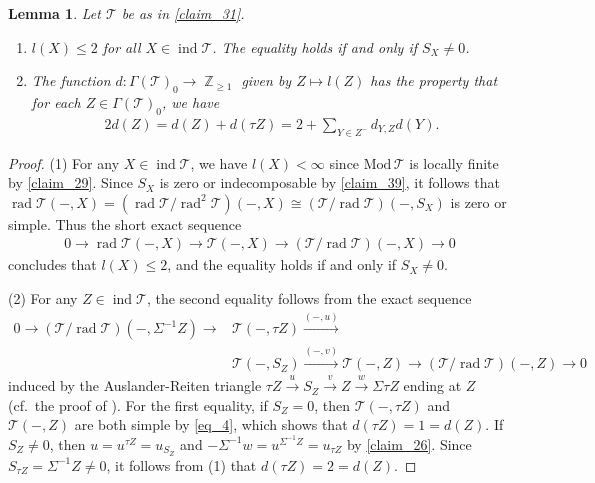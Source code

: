 \documentclass[12pt]{amsart}
\numberwithin{equation}{subsection}
\theoremstyle{plain}
\newtheorem{lemma}[theorem]{Lemma}
\theoremstyle{definition}
\newcommand{\rad}{\operatorname{rad}}
\newcommand{\Mod}{\mathrm{Mod}\,}
\newcommand{\ind}{\operatorname{ind}}
\newcommand{\Z}{\operatorname{\mathbb{Z}}\nolimits}
\newcommand{\G}{\Gamma}
\newcommand{\T}{\mathcal{T}}
\begin{document}
\begin{lemma}\label{claim_32}
Let $\T$ be as in \cref{claim_31}.
\begin{enumerate}
\item  $l(X) \leq 2$ for all $X\in\ind\T$. 
The equality holds if and only if $S_X\neq 0$.
\item 
The function $d: \G(\T)_0 \to \Z_{\geq 1}$ given by $Z\mapsto l(Z)$ has the property that for each $Z\in\G(\T)_0$, we have 
\begin{align}
    2 d(Z) = d(Z) + d(\tau Z) = 2+ \sum_{Y\in Z^-} d_{Y, Z} d(Y).
\end{align}
\end{enumerate}
\end{lemma}
\begin{proof} 
(1) For any $X\in\ind\T$, we have $l(X) <\infty$ since $\Mod\T$ is locally finite by \cref{claim_29}.
Since $S_X$ is zero or indecomposable by \cref{claim_39}, it follows that $\rad\T(-, X)=( \rad\T/\rad^2\T)(-, X)\cong(\T/\rad\T)(-, S_X)$ is zero or simple.
Thus the short exact sequence
\begin{align}
    0 \to \rad\T(-,X) \to \T(-, X)\to (\T/\rad\T)(-, X) \to 0
\end{align}
concludes that $l(X) \leq 2$, and the equality holds if and only if $S_X\neq 0$.





(2) For any $Z\in\ind\T$, the second equality follows from the exact sequence 
\begin{align}\label{eq_4}
    0 \to (\T/\rad\T)(-, \Sigma^{-1}Z) \to &\T(-,\tau Z) \xrightarrow{(-, u)}& \\
    &\T(-, S_Z)\xrightarrow{(-, v)} \T(-,Z) \to (\T/\rad\T)(-, Z) \to 0
\end{align}
induced by the Auslander-Reiten triangle $\tau Z \xrightarrow{u} S_Z \xrightarrow{v} Z \xrightarrow{w} \Sigma\tau Z$ ending at $Z$ (cf.~the proof of \cite[Proposition 3.4]{Krause_2012}).
For the first equality, if $S_Z=0$, then $\T(-, \tau Z)$ and $\T(-, Z)$ are both simple by \eqref{eq_4}, which shows that $d(\tau Z) =1 = d(Z)$.
If $S_Z\neq 0$, then $u=u^{\tau Z}=u_{S_Z}$ and $-\Sigma^{-1}w=u^{\Sigma^{-1}Z}=u_{\tau Z}$ by \cref{claim_26}. 
Since $S_{\tau Z}=\Sigma^{-1}Z\neq0$, it follows from (1) that  $d(\tau Z) = 2 = d(Z)$.
\end{proof}
\end{document}
